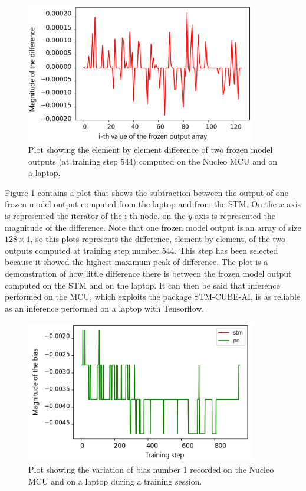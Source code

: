 \documentclass[12pt]{report}
\begin{document}
\begin{figure}[h!]
    \centering
    \includegraphics[width=100mm]{Figures/Chapter5/frozen_example.png} 
    \caption{Plot showing the element by element difference of two frozen model outputs (at training step 544) computed on the Nucleo MCU and on a laptop.}
    \label{fig:comparison_frozen}    
\end{figure}

Figure \ref{fig:comparison_frozen} contains a plot that shows the subtraction between the output of one frozen model output computed from the laptop and from the STM. On the $x$ axis is represented the iterator of the i-th node, on the $y$ axis is represented the magnitude of the difference. Note that one frozen model output is an array of size $128 \times 1$, so this plots represents the difference, element by element, of the two outputs computed at training step number 544. This step has been selected because it showed the highest maximum peak of difference. The plot is a demonstration of how little difference there is between the frozen model output computed on the STM and on the laptop. It can then be said that inference performed on the MCU, which exploits the package STM-CUBE-AI, is as reliable as an inference performed on a laptop with Tensorflow.

\begin{figure}[h!]
    \centering
    \includegraphics[width=100mm]{Figures/Chapter5/bias_example.png} 
    \caption{Plot showing the variation of bias number 1 recorded on the Nucleo MCU and on a laptop during a training session.}
    \label{fig:comparison_bias}    
\end{figure}
\end{document}
